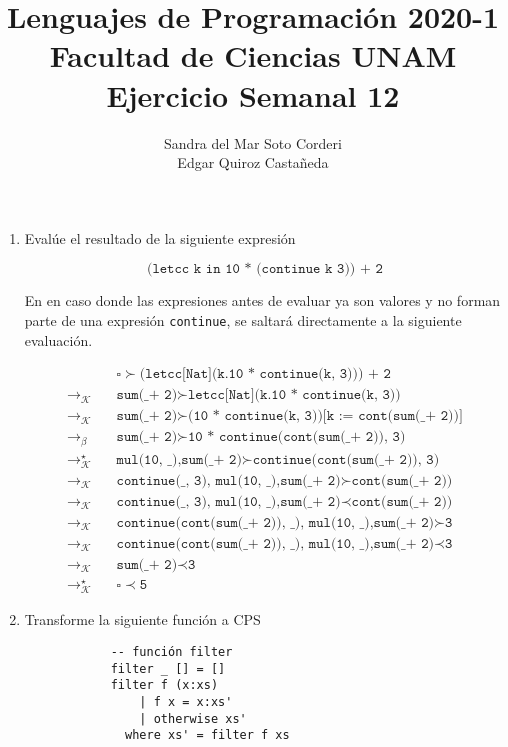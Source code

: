 \documentclass{article}
\title{
    Lenguajes de Programación 2020-1\\
    Facultad de Ciencias UNAM\\
    Ejercicio Semanal 12
}
\author{
    Sandra del Mar Soto Corderi\\
    Edgar Quiroz Castañeda
}
\newcommand{\tx}[1]{\texttt{#1}}
\newcommand{\es}{$\square$}
\newcommand{\pop}[2]{ \tx{#1} \succ \tx{#2}}
\newcommand{\push}[2]{ \tx{#1} \prec \tx{#2}}
\newcommand{\kr}{\rightarrow_{\mathcal{K}} \quad}
\newcommand{\br}{\rightarrow_{\beta} \quad}
\newcommand{\krs}{\rightarrow_{\mathcal{K}}^{\star} \quad}
\begin{document}
    
    \maketitle

    \begin{enumerate}
        \item Evalúe el resultado de la siguiente expresión

        \[
            \tx{(letcc k in 10 * (continue k 3)) + 2}
        \]

        En en caso donde las expresiones antes de evaluar ya son valores y no
        forman parte de una expresión \tx{continue}, se saltará directamente a
        la siguiente evaluación.

        \begin{align*}
            & \pop{\es}{(letcc[Nat](k.10 * continue(k, 3))) + 2} \\
            \kr & \pop{sum(\_ + 2)}{letcc[Nat](k.10 * continue(k, 3))} \\
            \kr & \pop{sum(\_ + 2)}{(10 * continue(k, 3))[k := cont(sum(\_ + 2))]} \\
            \br & \pop{sum(\_ + 2)}{10 * continue(cont(sum(\_ + 2)), 3)} \\
            \krs & \pop{mul(10, \_),sum(\_ + 2)}{continue(cont(sum(\_ + 2)), 3)} \\
            \kr & \pop{continue(\_, 3), mul(10, \_),sum(\_ + 2)}{cont(sum(\_ + 2))} \\
            \kr & \push{continue(\_, 3), mul(10, \_),sum(\_ + 2)}{cont(sum(\_ + 2))} \\
            \kr & \pop{continue(cont(sum(\_ + 2)), \_), mul(10, \_),sum(\_ + 2)}{3} \\
            \kr & \push{continue(cont(sum(\_ + 2)), \_), mul(10, \_),sum(\_ + 2)}{3} \\
            \kr & \push{sum(\_ + 2)}{3} \\
            \krs & \push{\es}{5}
        \end{align*}

        \item Transforme la siguiente función a CPS

        \begin{verbatim}
            -- función filter
            filter _ [] = []
            filter f (x:xs) 
                | f x = x:xs'
                | otherwise xs'
              where xs' = filter f xs
        \end{verbatim}


\end{enumerate}
\end{document}
